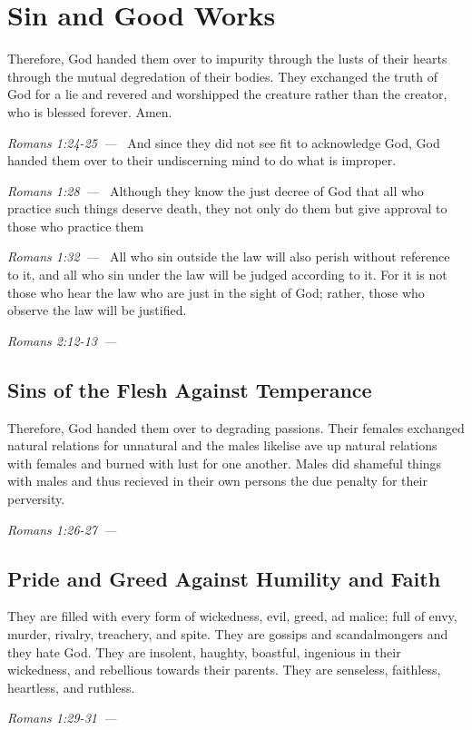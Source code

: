 \documentclass[10pt]{article}
\let\oldquote\quote
\let\endoldquote\endquote
\renewenvironment{quote}[2][]
  {\if\relax\detokenize{#1}\relax
     \def\quoteauthor{#2}%
   \else
     \def\quoteauthor{#2~---~#1}%
   \fi
   \oldquote}
  {\par\nobreak\smallskip\hfill\textit{\quoteauthor}%
   \endoldquote\addvspace{\bigskipamount}}
\begin{document}
\section*{Sin and Good Works}

\begin{quote}{Romans 1:24-25}
Therefore, God handed them over to impurity through the lusts of their hearts through the mutual degredation of their bodies. They exchanged the truth of God for a lie and revered and worshipped the creature rather than the creator, who is blessed forever. Amen.
\end{quote}
\begin{quote}{Romans 1:28}
And since they did not see fit to acknowledge God, God handed them over to their undiscerning mind to do what is improper.
\end{quote}
\begin{quote}{Romans 1:32}
Although they know the just decree of God that all who practice such things deserve death, they not only do them but give approval to those who practice them
\end{quote}
\begin{quote}{Romans 2:12-13}
All who sin outside the law will also perish without reference to it, and all who sin under the law will be judged according to it. For it is not those who hear the law who are just in the sight of God; rather, those who observe the law will be justified. 
\end{quote}

\subsection*{Sins of the Flesh Against Temperance}
\begin{quote}{Romans 1:26-27}
Therefore, God handed them over to degrading passions. Their females exchanged natural relations for unnatural and the males likelise ave up natural relations with females and burned with lust for one another. Males did shameful things with males and thus recieved in their own persons the due penalty for their perversity. 
\end{quote}

\subsection*{Pride and Greed Against Humility and Faith}
\begin{quote}{Romans 1:29-31}
They are filled with every form of wickedness, evil, greed, ad malice; full of envy, murder, rivalry, treachery, and spite. They are gossips and scandalmongers and they hate God. They are insolent, haughty, boastful, ingenious in their wickedness, and rebellious towards their parents. They are senseless, faithless, heartless, and ruthless. 
\end{quote}
\end{document}
